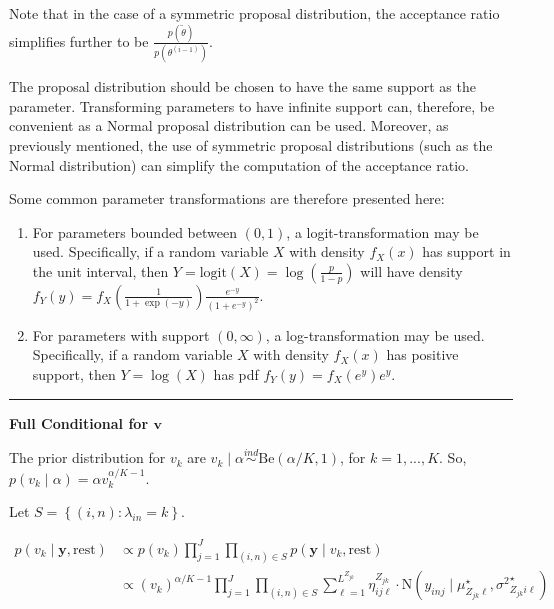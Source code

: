 \documentclass[12pt,]{article}
\providecommand{\tightlist}{%
  \setlength{\itemsep}{0pt}\setlength{\parskip}{0pt}}
\newcommand{\p}[1]{\left(#1\right)}
\newcommand{\bc}[1]{ \left\{#1\right\} }
\newcommand{\N}{ \mathcal{N} }
\newcommand{\ind}{\overset{ind}{\sim}}
\def\logit{\text{logit}}
\def\N{\text{N}}
\def\Be{\text{Be}}
\def\lin{\lambda_{in}}
\def\y{\bm{y}}
\def\mus{\mu^\star}
\def\sss{{\sigma^2}^\star}
\def\rest{\text{rest}}
\begin{document}
Note that in the case of a symmetric proposal distribution, the
acceptance ratio simplifies further to be
\(\frac{p(\tilde\theta)}{p(\theta^{(i-1)})}\).

The proposal distribution should be chosen to have the same support as
the parameter. Transforming parameters to have infinite support can,
therefore, be convenient as a Normal proposal distribution can be used.
Moreover, as previously mentioned, the use of symmetric proposal
distributions (such as the Normal distribution) can simplify the
computation of the acceptance ratio.

Some common parameter transformations are therefore presented here:

\begin{enumerate}
\def\labelenumi{\arabic{enumi}.}
\tightlist
\item
  For parameters bounded between \((0,1)\), a logit-transformation may
  be used. Specifically, if a random variable \(X\) with density
  \(f_X(x)\) has support in the unit interval, then
  \(Y=\logit(X)=\log\p{\frac{p}{1-p}}\) will have density
  \(f_Y(y) = f_X\p{\frac{1}{1+\exp(-y)}}\frac{e^{-y}}{(1+e^{-y})^{2}}\).
\item
  For parameters with support \((0,\infty)\), a log-transformation may
  be used. Specifically, if a random variable \(X\) with density
  \(f_X(x)\) has positive support, then \(Y = \log(X)\) has pdf
  \(f_Y(y) = f_X(e^y) e^y\).
\end{enumerate}



\vspace{5em}
\hrule
\vspace{5em}

\textbf{Full Conditional for $\bm v$}

The prior distribution for \(v_k\) are
\(v_k \mid \alpha \ind \Be(\alpha/K, 1)\), for \(k = 1,...,K\). So,
\(p(v_k \mid \alpha) = \alpha v_k^{\alpha/K-1}\).

Let \(S = \bc{(i,n)\colon \lin = k}\).

\begin{align*}
p(v_k \mid \y, \rest) &\propto p(v_k) \prod_{j=1}^J\prod_{(i,n)\in S} p(\y \mid v_k, \rest) \\
&\propto (v_k)^{\alpha/K-1} \prod_{j=1}^J \prod_{(i,n)\in S}
\sum_{\ell=1}^{L^{Z_{jk}}} \eta^{Z_{jk}}_{ij\ell} \cdot
\N(y_{inj} \mid \mus_{Z_{jk}\ell}, \sss_{Z_{jk}i\ell})
\end{align*}
\end{document}

